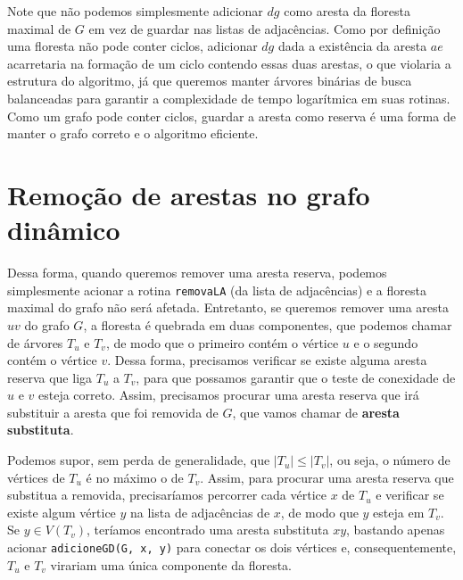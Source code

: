 Note que não podemos simplesmente adicionar $dg$ como aresta da floresta maximal de $G$ em vez de guardar nas listas de adjacências. Como por definição uma floresta não pode conter ciclos, adicionar $dg$ dada a existência da aresta $ae$ acarretaria na formação de um ciclo contendo essas duas arestas, o que violaria a estrutura do algoritmo, já que queremos manter árvores binárias de busca balanceadas para garantir a complexidade de tempo logarítmica em suas rotinas. Como um grafo pode conter ciclos, guardar a aresta como reserva é uma forma de manter o grafo correto e o algoritmo eficiente. 

\section{Remoção de arestas no grafo dinâmico}
\label{sec:dynamic-graph-edge-removal}

Dessa forma, quando queremos remover uma aresta reserva, podemos simplesmente acionar a rotina \texttt{removaLA} (da lista de adjacências) e a floresta maximal do grafo não será afetada. Entretanto, se queremos remover uma aresta $uv$ do grafo $G$, a floresta é quebrada em duas componentes, que podemos chamar de árvores $T_u$ e $T_v$, de modo que o primeiro contém o vértice $u$ e o segundo contém o vértice $v$. Dessa forma, precisamos verificar se existe alguma aresta reserva que liga $T_u$ a $T_v$, para que possamos garantir que o teste de conexidade de $u$ e $v$ esteja correto. Assim, precisamos procurar uma aresta reserva que irá substituir a aresta que foi removida de $G$, que vamos chamar de \textbf{aresta substituta}.

Podemos supor, sem perda de generalidade, que $|T_u| \leq |T_v|$, ou seja, o número de vértices de $T_u$ é no máximo o de $T_v$. Assim, para procurar uma aresta reserva que substitua a removida, precisaríamos percorrer cada vértice $x$ de $T_u$ e verificar se existe algum vértice $y$ na lista de adjacências de $x$, de modo que $y$ esteja em $T_v$. Se $y \in V(T_v)$, teríamos encontrado uma aresta substituta $xy$, bastando apenas acionar \texttt{adicioneGD(G, x, y)} para conectar os dois vértices e, consequentemente, $T_u$ e $T_v$ virariam uma única componente da floresta.

